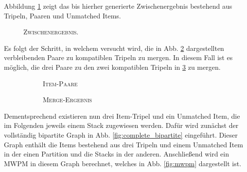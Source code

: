 Abbildung \ref{fig:intermediate_result} zeigt das bis hierher generierte Zwischenergebnis bestehend aus Tripeln, Paaren
und Unmatched Items.

\begin{figure}[H]
\centering
{}
\caption{\textsc{Zwischenergebnis.}}
\label{fig:intermediate_result}
\end{figure}

Es folgt der Schritt, in welchem versucht wird, die in Abb. \ref{fig:item_pairs} dargestellten verbleibenden Paare zu
kompatiblen Tripeln zu mergen. In diesem Fall ist es möglich, die drei Paare zu den zwei kompatiblen Tripeln in
\ref{fig:merge_result} zu mergen.

\begin{figure}[H]
\centering
\begin{subfigure}[b]{0.4\textwidth}
\centering
{}
\caption{\textsc{Item-Paare}}
\label{fig:item_pairs}
\end{subfigure}
\hspace{10pt}
\begin{subfigure}[b]{0.4\textwidth}
\centering
{}
\caption{\textsc{Merge-Ergebnis}}
\label{fig:merge_result}
\end{subfigure}
\caption{}
\label{fig:merge_step}
\end{figure}

Dementsprechend existieren nun drei Item-Tripel und ein Unmatched Item, die im Folgenden jeweils einem Stack zugewiesen werden.
Dafür wird zunächst der vollständig bipartite Graph in Abb. \ref{fig:complete_bipartite} eingeführt.
Dieser Graph enthält die Items bestehend aus drei Tripeln und einem Unmatched Item in der einen Partition
und die Stacks in der anderen. Anschließend wird ein \textsc{MWPM} in diesem Graph berechnet, welches
in Abb. \ref{fig:mwpm} dargestellt ist.

